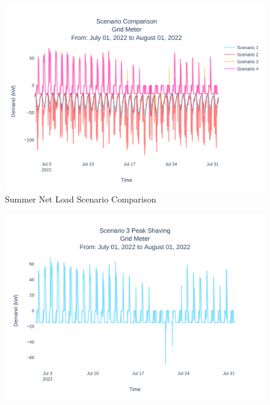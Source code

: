 \documentclass[conference]{IEEEtran}
\begin{document}
    
	\begin{figure}[H]
		\centering
		\includegraphics[width=1\linewidth]{Fig/net_load_scenario_comparison_summer_run_2}
		\caption{Summer Net Load Scenario Comparison}
		\label{fig:netloadscenariocomparisonsummer}
	\end{figure}
	
	
	\begin{figure}[H]
		\centering
		\includegraphics[width=1\linewidth]{Fig/scenario_3_peak_shaving}
		\caption{}
		\label{fig:scenario3peakshaving}
	\end{figure}
	
\end{document}
